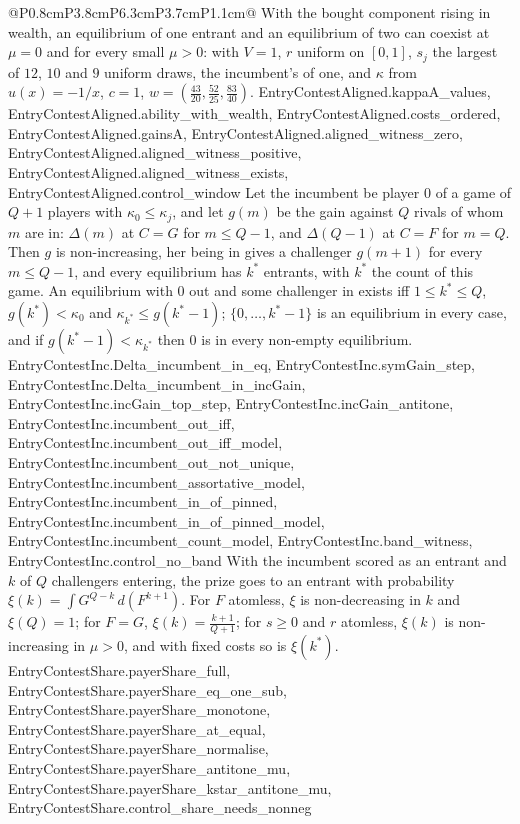 \begin{longtable}{@{}P{0.8cm}P{3.8cm}P{6.3cm}P{3.7cm}P{1.1cm}@{}}
  {With the bought component rising in wealth, an equilibrium of one entrant and an
  equilibrium of two can coexist at $\mu=0$ and for every small $\mu>0$: with
  $V=1$, $r$ uniform on $[0,1]$, $s_j$ the largest of $12$, $10$ and $9$
  uniform draws, the incumbent's of one, and $\kappa$ from $u(x)=-1/x$, $c=1$,
  $w=(\frac{43}{20},\frac{52}{25},\frac{83}{40})$.}
  {EntryContestAligned.kappaA_values, EntryContestAligned.ability_with_wealth, EntryContestAligned.costs_ordered, EntryContestAligned.gainsA, EntryContestAligned.aligned_witness_zero, EntryContestAligned.aligned_witness_positive, EntryContestAligned.aligned_witness_exists, EntryContestAligned.control_window}
  {Let the incumbent be player $0$ of a game of $Q+1$ players with
  $\kappa_0\le\kappa_j$, and let $g(m)$ be the gain against $Q$ rivals of whom
  $m$ are in: $\Delta(m)$ at $C=G$ for $m\le Q-1$, and $\Delta(Q-1)$ at $C=F$
  for $m=Q$. Then $g$ is non-increasing, her being in gives a challenger
  $g(m+1)$ for every $m\le Q-1$, and every equilibrium has $k^*$ entrants, with
  $k^*$ the count of this game. An equilibrium with $0$ out and some
  challenger in exists iff $1\le k^*\le Q$, $g(k^*)<\kappa_0$ and
  $\kappa_{k^*}\le g(k^*-1)$; $\{0,\dots,k^*-1\}$ is an equilibrium in every
  case, and if $g(k^*-1)<\kappa_{k^*}$ then $0$ is in every non-empty
  equilibrium.}
  {EntryContestInc.Delta_incumbent_in_eq, EntryContestInc.symGain_step, EntryContestInc.Delta_incumbent_in_incGain, EntryContestInc.incGain_top_step, EntryContestInc.incGain_antitone, EntryContestInc.incumbent_out_iff, EntryContestInc.incumbent_out_iff_model, EntryContestInc.incumbent_out_not_unique, EntryContestInc.incumbent_assortative_model, EntryContestInc.incumbent_in_of_pinned, EntryContestInc.incumbent_in_of_pinned_model, EntryContestInc.incumbent_count_model, EntryContestInc.band_witness, EntryContestInc.control_no_band}
  {With the incumbent scored as an entrant and $k$ of $Q$ challengers
  entering, the prize goes to an entrant with probability
  $\xi(k)=\int G^{Q-k}\,d(F^{k+1})$. For $F$
  atomless, $\xi$ is non-decreasing in $k$ and $\xi(Q)=1$; for $F=G$,
  $\xi(k)=\frac{k+1}{Q+1}$; for $s\ge0$ and $r$ atomless, $\xi(k)$ is
  non-increasing in $\mu>0$, and with fixed costs so is $\xi(k^*)$.}
  {EntryContestShare.payerShare_full, EntryContestShare.payerShare_eq_one_sub, EntryContestShare.payerShare_monotone, EntryContestShare.payerShare_at_equal, EntryContestShare.payerShare_normalise, EntryContestShare.payerShare_antitone_mu, EntryContestShare.payerShare_kstar_antitone_mu, EntryContestShare.control_share_needs_nonneg}

\end{longtable}
